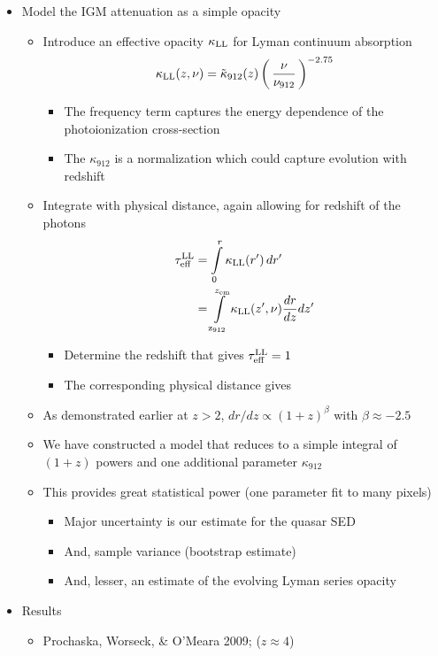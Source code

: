 \documentclass[12pt,letterpaper]{article}
\begin{document}
\begin{Aenumerate}
\begin{itemize}
\begin{itemize}
\begin{itemize}
\begin{itemize}
  	  	\end{itemize}
  	  \end{itemize}
  	\item Model the IGM attenuation as a simple opacity
  		\begin{itemize}
  		\item Introduce an effective opacity $\kappa_{\rm LL}$
  		for Lyman continuum absorption
  		\begin{equation}
  		\kappa_{\rm LL}(z,\nu) = \tilde\kappa_{912}(z) \left ( \, \frac{\nu}{\nu_{912}} \, \right )^{-2.75}
  		\end{equation}
  			\begin{itemize}
  			\item The frequency term captures the energy dependence of the
  			photoionization cross-section 
  			\item The $\kappa_{912}$ is a normalization which could capture evolution with redshift 
  			\end{itemize}
  		\item Integrate with physical distance, again allowing for redshift
  		of the photons
  		\begin{align}
  		\tau_{\rm eff}^{\rm LL} &= \int\limits_0^r \kappa_{\rm LL}(r') \, dr'  \\
  		&= \int\limits_{\rm z_{912}}^{z_{\rm em}} \kappa_{\rm LL}(z',\nu) \frac{dr}{dz} dz'
  		\end{align}
  			\begin{itemize}
  			\item Determine the redshift that gives $\tau_{\rm eff}^{\rm LL} = 1$
  			\item The corresponding physical distance gives \lmfp\ 
  			\end{itemize}
  		\item As demonstrated earlier at $z>2$, 
  		$dr/dz \propto (1+z)^\beta$ with $\beta \approx -2.5$
  		\item We have constructed a model that reduces to a simple integral
  		of $(1+z)$ powers and one additional parameter $\kappa_{912}$
  		\item This provides great statistical power (one parameter fit to
  		many pixels)
  			\begin{itemize}
  			\item Major uncertainty is our estimate for the quasar SED
  			\item And, sample variance (bootstrap estimate)
  			\item And, lesser, an estimate of the evolving Lyman series opacity
  			\end{itemize}
  		\end{itemize}
  	\item Results
  		\begin{itemize}
  		\item Prochaska, Worseck, \& O'Meara 2009; ($z \approx 4$)


\end{itemize}
\end{itemize}
\end{itemize}
\end{Aenumerate}
\end{document}
